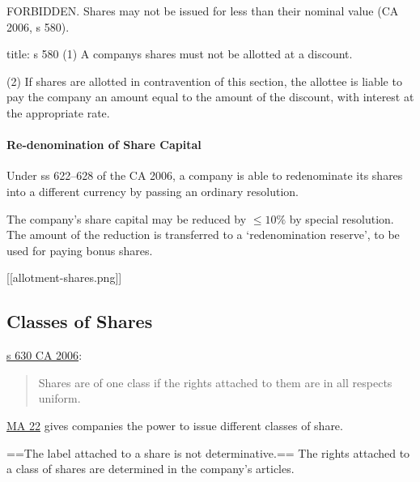 \documentclass[
]{article}
\newenvironment{Shaded}{}{}
\newcommand{\NormalTok}[1]{#1}
\begin{document}
FORBIDDEN. Shares may not be issued for less than their nominal value
(CA 2006, s 580).

\begin{Shaded}
\begin{Highlighting}[]
\NormalTok{title: s 580}
\NormalTok{(1) A company\textquotesingle{}s shares must not be allotted at a discount.}

\NormalTok{(2) If shares are allotted in contravention of this section, the allottee is liable to pay the company an amount equal to the amount of the discount, with interest at the appropriate rate.}
\end{Highlighting}
\end{Shaded}

\hypertarget{re-denomination-of-share-capital}{%
\paragraph{Re-denomination of Share
Capital}\label{re-denomination-of-share-capital}}

Under ss 622--628 of the CA 2006, a company is able to redenominate its
shares into a different currency by passing an ordinary resolution.

The company's share capital may be reduced by \(\leq 10\%\) by special
resolution. The amount of the reduction is transferred to a
`redenomination reserve', to be used for paying bonus shares.

{[}{[}allotment-shares.png{]}{]}

\hypertarget{classes-of-shares}{%
\subsection{Classes of Shares}\label{classes-of-shares}}

\href{https://www.legislation.gov.uk/ukpga/2006/46/section/629}{s 630 CA
2006}:

\begin{quote}
Shares are of one class if the rights attached to them are in all
respects uniform.
\end{quote}

\href{https://www.gov.uk/government/publications/model-articles-for-private-companies-limited-by-shares/model-articles-for-private-companies-limited-by-shares\#differentclasses}{MA
22} gives companies the power to issue different classes of share.

==The label attached to a share is not determinative.== The rights
attached to a class of shares are determined in the company's articles.
\end{document}
